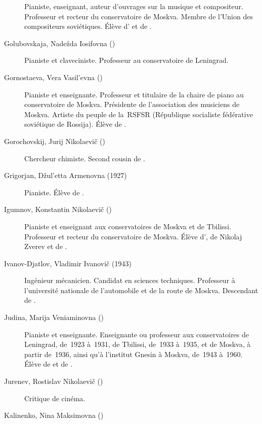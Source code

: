 \begin{description}
 Pianiste, enseignant, auteur d'ouvrages sur la musique et compositeur.
 Professeur et recteur du conservatoire de Moskva.
 Membre de l'\hbox{Union} des compositeurs soviétiques.
 Élève d'\AZiloti{} et de \PPabst{}.
 \item[Golubovskaja, Nadežda Iosifovna (\Dates{1891}{1975})]%
 Pianiste et claveciniste.
 Professeur au conservatoire de Leningrad.
 \item[Gornostaeva, Vera Vasil'evna (\Dates{1936}{2015})]%
 Pianiste et enseignante.
 Professeur et titulaire de la chaire de piano au conservatoire de Moskva.
 Présidente de l'association des musiciens de Moskva.
 Artiste du peuple de la~RSFSR (République socialiste fédérative soviétique
 de Rossija).
 Élève de \HNeuhaus{}.
 \item[Gorochovskij, Jurij Nikolaevič (\Dates{1907}{1973})]%
 Chercheur chimiste.
 Second cousin de \VSofronitsky{}.
 \item[Grigorjan, Džul'etta Armenovna (1927\dvsborn{})]%
 Pianiste.
 Élève de \VSofronitsky{}.
 \item[Igumnov, Konstantin Nikolaevič (\Dates{1873}{1948})]%
 Pianiste et enseignant aux conservatoires de Moskva et de Tbilissi.
 Professeur et recteur du conservatoire de Moskva.
 Élève d'\AZiloti{}, de Nikolaj Zverev et de \PPabst{}.
 \item[Ivanov-Djatlov, Vladimir Ivanovič (1943\dvsborn{})]%
 Ingénieur mécanicien.
 Candidat en sciences techniques.
 Professeur à l'université nationale de l'automobile et de la route de
 Moskva.
 Descendant de \STaneiev{}.
 \item[Judina, Marija Veniaminovna (\Dates{1899}{1970})]%
 Pianiste et enseignante.
 Enseignante ou professeur aux conservatoires de Leningrad, de~1923 à~1931,
 de Tbilissi, de~1933 à~1935, et de Moskva, à partir de~1936, ainsi qu'à
 l'institut Gnesin à Moskva, de~1943 à~1960.
 Élève de \FBlumenfeld{} et de \LNikolaiev{}.
 \item[Jurenev, Rostislav Nikolaevič (\Dates{1912}{2002})]%
 Critique de cinéma.
 \item[Kalinenko, Nina Maksimovna (\Dates{1923}{2006})]%

\end{description}
